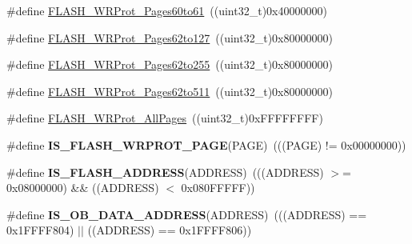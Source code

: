 \begin{DoxyCompactItemize}
\item 
\#define \hyperlink{group__Option__Bytes__Write__Protection_ga22f620be7f346efcb2cbb732b879fd0c}{FLASH\_\-WRProt\_\-Pages60to61}~((uint32\_\-t)0x40000000)
\item 
\#define \hyperlink{group__Option__Bytes__Write__Protection_ga346285408d8f738796fc22d710777ba9}{FLASH\_\-WRProt\_\-Pages62to127}~((uint32\_\-t)0x80000000)
\item 
\#define \hyperlink{group__Option__Bytes__Write__Protection_gacec4a825ff505ef5751ec6e5cf6d941e}{FLASH\_\-WRProt\_\-Pages62to255}~((uint32\_\-t)0x80000000)
\item 
\#define \hyperlink{group__Option__Bytes__Write__Protection_gab233da6081eaf5d664f16c0e8c7df138}{FLASH\_\-WRProt\_\-Pages62to511}~((uint32\_\-t)0x80000000)
\item 
\#define \hyperlink{group__Option__Bytes__Write__Protection_ga6fdaf38a559d606660dd10a411b77ea5}{FLASH\_\-WRProt\_\-AllPages}~((uint32\_\-t)0xFFFFFFFF)
\item 
\hypertarget{group__Option__Bytes__Write__Protection_gafe68b93dfb1ebf68d74f871850ab373b}{
\#define {\bfseries IS\_\-FLASH\_\-WRPROT\_\-PAGE}(PAGE)~(((PAGE) != 0x00000000))}
\label{group__Option__Bytes__Write__Protection_gafe68b93dfb1ebf68d74f871850ab373b}

\item 
\hypertarget{group__Option__Bytes__Write__Protection_gad0c8166ba15a0b8d458412a8bb74e2f0}{
\#define {\bfseries IS\_\-FLASH\_\-ADDRESS}(ADDRESS)~(((ADDRESS) $>$= 0x08000000) \&\& ((ADDRESS) $<$ 0x080FFFFF))}
\label{group__Option__Bytes__Write__Protection_gad0c8166ba15a0b8d458412a8bb74e2f0}

\item 
\hypertarget{group__Option__Bytes__Write__Protection_ga73fcac8d5f301a5c98518374ae926633}{
\#define {\bfseries IS\_\-OB\_\-DATA\_\-ADDRESS}(ADDRESS)~(((ADDRESS) == 0x1FFFF804) $|$$|$ ((ADDRESS) == 0x1FFFF806))}
\label{group__Option__Bytes__Write__Protection_ga73fcac8d5f301a5c98518374ae926633}

\end{DoxyCompactItemize}


